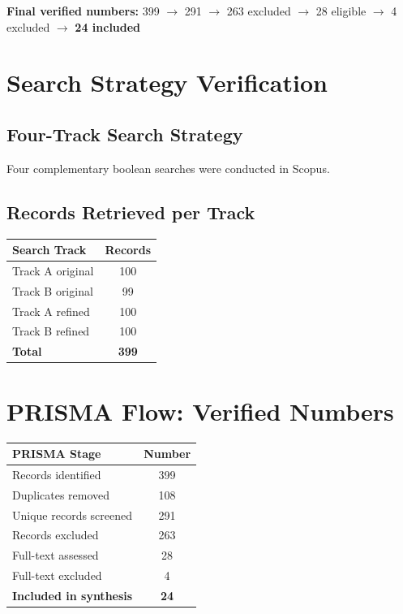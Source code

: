 \documentclass[11pt, a4paper]{article}
\begin{document}
\textbf{Final verified numbers:} 399 $\rightarrow$ 291 $\rightarrow$ 263 excluded $\rightarrow$ 28 eligible $\rightarrow$ 4 excluded $\rightarrow$ \textbf{24 included}

\section{Search Strategy Verification}

\subsection{Four-Track Search Strategy}

Four complementary boolean searches were conducted in Scopus.

\subsection{Records Retrieved per Track}

\begin{table}[h!]
\centering
\begin{tabular}{lc}
\toprule
\textbf{Search Track} & \textbf{Records} \\
\midrule
Track A original & 100 \\
Track B original & 99 \\
Track A refined & 100 \\
Track B refined & 100 \\
\midrule
\textbf{Total} & \textbf{399} \\
\bottomrule
\end{tabular}
\end{table}

\section{PRISMA Flow: Verified Numbers}

\begin{table}[h!]
\centering
\begin{tabular}{lc}
\toprule
\textbf{PRISMA Stage} & \textbf{Number} \\
\midrule
Records identified & 399 \\
Duplicates removed & 108 \\
Unique records screened & 291 \\
Records excluded & 263 \\
Full-text assessed & 28 \\
Full-text excluded & 4 \\
\textbf{Included in synthesis} & \textbf{24} \\
\bottomrule
\end{tabular}
\end{table}
\end{document}

